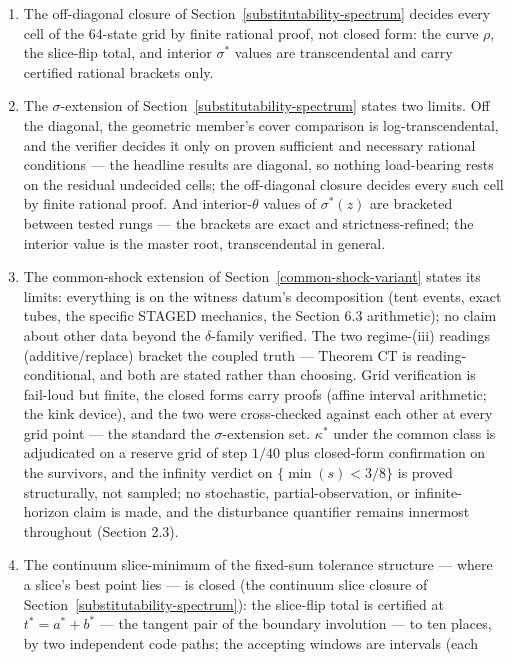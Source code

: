 \documentclass[3p,11pt]{elsarticle}
\begin{document}
\begin{enumerate}
\item
  The off-diagonal closure of Section~\ref{substitutability-spectrum}
  decides every cell of the 64-state grid by finite rational proof,
  not closed form: the curve \(\rho\), the slice-flip total, and
  interior \(\sigma^*\) values are transcendental and carry
  certified rational brackets only.
\item
  The \(\sigma\)-extension of Section~\ref{substitutability-spectrum}
  states two limits. Off the diagonal, the geometric
  member's cover comparison is log-transcendental, and the
  verifier decides it only on proven sufficient and necessary
  rational conditions --- the headline results are diagonal, so
  nothing load-bearing rests on the residual undecided cells;
  the off-diagonal closure decides every such cell by finite
  rational proof. And interior-\(\theta\)
  values of \(\sigma^*(z)\) are bracketed between tested rungs
  --- the brackets are exact and strictness-refined; the interior
  value is the master root, transcendental in general.
\item
  The common-shock extension of Section~\ref{common-shock-variant}
  states its limits: everything is on the witness datum's
  decomposition (tent events, exact tubes,
  the specific STAGED mechanics, the Section 6.3 arithmetic);
  no claim about other data
  beyond the \(\delta\)-family verified. The two regime-(iii)
  readings (additive/replace) bracket the coupled truth ---
  Theorem CT is reading-conditional, and both are
  stated rather than choosing. Grid verification is
  fail-loud but finite, the closed forms carry proofs
  (affine interval arithmetic; the kink device), and the two
  were cross-checked against each other at every grid point
  --- the standard the \(\sigma\)-extension set. \(\kappa^*\)
  under the common class is adjudicated on a reserve grid of
  step \(1/40\) plus closed-form confirmation on the survivors,
  and the infinity verdict on \(\{\min(s) < 3/8\}\) is
  proved structurally, not sampled; no stochastic,
  partial-observation, or infinite-horizon claim is made, and
  the disturbance quantifier remains innermost throughout
  (Section 2.3).
\item
  The continuum slice-minimum of the fixed-sum tolerance structure
  --- where a slice's best point lies --- is closed (the continuum
  slice closure of Section~\ref{substitutability-spectrum}): the
  slice-flip total is certified at \(t^{*} = a^{*} + b^{*}\) --- the
  tangent pair of the boundary involution --- to ten places, by two
  independent code paths; the accepting windows are intervals (each

\end{enumerate}
\end{document}
